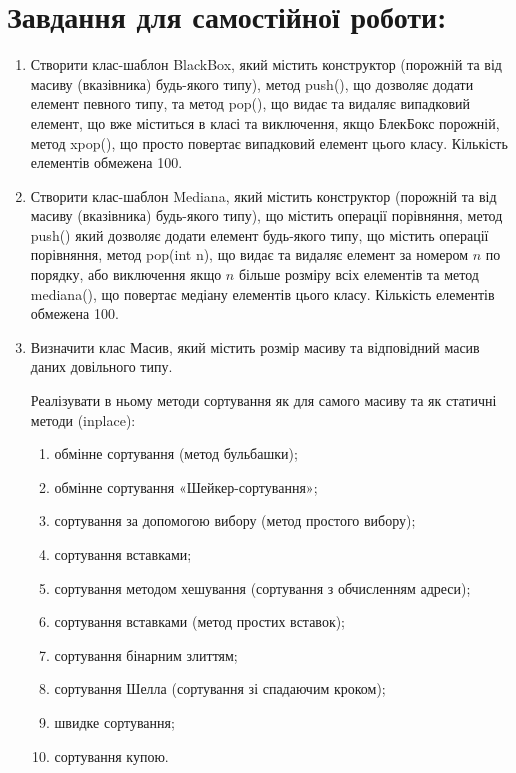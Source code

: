 \documentclass[a5paper,titlepage,openany,twoside,draft]{book_unv}%
\makeatletter
\newcommand{\xslalph}[1]{\expandafter\@xslalph\csname c@#1\endcsname}
\newcommand{\@xslalph}[1]{%
    \ifcase#1\or а\or б\or в\or г\or д\or e\or є\or ж\or з\or i%
    \or й\or к\or л\or м\or н\or о\or п\or р\or с\or т%
    \or у\or ф\or х\or ц\or ч\or ш\or ю\or я\or аа\or бб\or вв%
    \else\@ctrerr\fi%
}
\makeatother
\begin{document}
\section{Завдання для самостійної роботи:}

\begin{enumerate}
\def\labelenumi{\arabic{enumi})}
\setcounter{enumi}{3}
\item
  Створити клас-шаблон BlackBox, який містить конструктор
  (порожній та від масиву (вказівника) будь-якого типу), метод push(),
  що дозволяє додати елемент певного типу, та метод pop(), що видає та
  видаляє випадковий елемент, що вже міститься в класі та виключення,
  якщо БлекБокс порожній, метод xpop(), що просто повертає випадковий
  елемент цього класу. Кількість елементів обмежена 100.
\item
  Створити клас-шаблон Mediana, який містить конструктор (порожній та
  від масиву (вказівника) будь-якого типу), що містить операції
  порівняння, метод push() який дозволяє додати елемент будь-якого типу,
  що містить операції порівняння, метод pop(int n), що видає та
  видаляє елемент за номером $n$ по порядку, або виключення якщо $n$ більше
  розміру всіх елементів та метод mediana(), що повертає медіану елементів
  цього класу. Кількість елементів обмежена 100.
\item
Визначити клас Масив, який містить розмір масиву та 
відповідний масив даних довільного типу. 

Реалізувати в ньому методи сортування як для самого масиву та як статичні методи (inplace):
\begin{enumerate}[label=\xslalph*)]
\item
обмінне сортування (метод бульбашки); 
\item
обмінне сортування «Шейкер-сортування»;
\item
сортування за допомогою вибору (метод простого вибору);
\item
сортування вставками;
\item
сортування методом хешування (сортування з обчисленням адреси);
\item
сортування вставками (метод простих вставок);
\item
сортування бінарним злиттям;
\item
сортування Шелла (сортування зі спадаючим кроком);
\item
швидке сортування;
\item
сортування купою.
\end{enumerate}


\end{enumerate}
\end{document}
